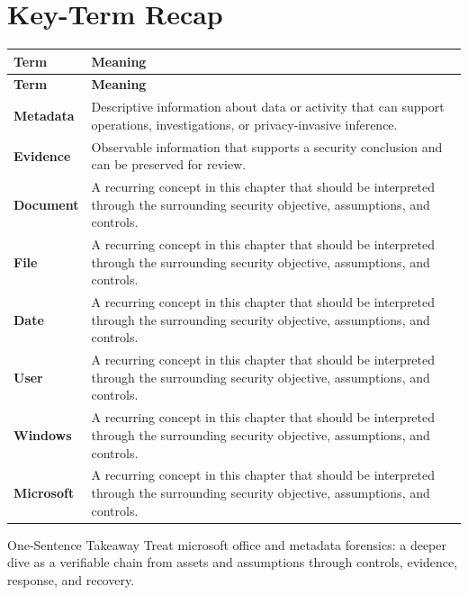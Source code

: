 \documentclass[11pt,letterpaper]{article}
\begin{document}
\section*{Key-Term Recap}
\begin{longtable}{>{\raggedright\arraybackslash}p{}>{\raggedright\arraybackslash}p{}}
\toprule\rowcolor{Navy}\color{white}\textbf{Term} & \color{white}\textbf{Meaning}\\\midrule
\endfirsthead
\toprule\rowcolor{Navy}\color{white}\textbf{Term} & \color{white}\textbf{Meaning}\\\midrule
\endhead
\textbf{Metadata} & Descriptive information about data or activity that can support operations, investigations, or privacy-invasive inference. \\\midrule
\textbf{Evidence} & Observable information that supports a security conclusion and can be preserved for review. \\\midrule
\textbf{Document} & A recurring concept in this chapter that should be interpreted through the surrounding security objective, assumptions, and controls. \\\midrule
\textbf{File} & A recurring concept in this chapter that should be interpreted through the surrounding security objective, assumptions, and controls. \\\midrule
\textbf{Date} & A recurring concept in this chapter that should be interpreted through the surrounding security objective, assumptions, and controls. \\\midrule
\textbf{User} & A recurring concept in this chapter that should be interpreted through the surrounding security objective, assumptions, and controls. \\\midrule
\textbf{Windows} & A recurring concept in this chapter that should be interpreted through the surrounding security objective, assumptions, and controls. \\\midrule
\textbf{Microsoft} & A recurring concept in this chapter that should be interpreted through the surrounding security objective, assumptions, and controls. \\\midrule
\bottomrule
\end{longtable}
\begin{CornellExamBox}{One-Sentence Takeaway}
Treat microsoft office and metadata forensics: a deeper dive as a verifiable chain from assets and assumptions through controls, evidence, response, and recovery.
\end{CornellExamBox}
\end{document}
